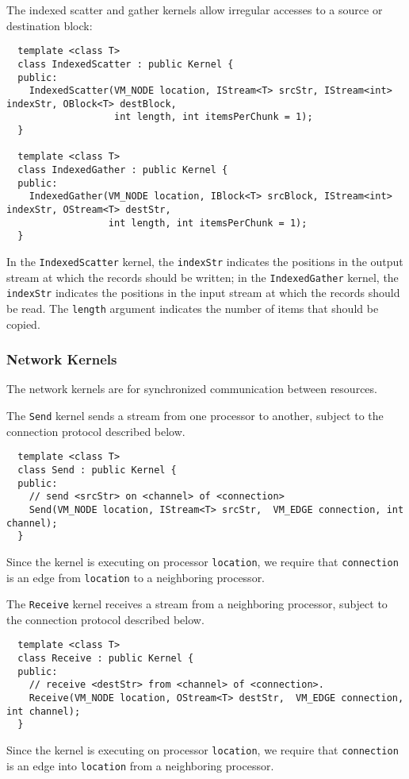 The indexed scatter and gather kernels allow irregular accesses to a
source or destination block:
{\small
\begin{verbatim}
  template <class T>
  class IndexedScatter : public Kernel {
  public:
    IndexedScatter(VM_NODE location, IStream<T> srcStr, IStream<int> indexStr, OBlock<T> destBlock, 
                   int length, int itemsPerChunk = 1);
  }

  template <class T>
  class IndexedGather : public Kernel {
  public:
    IndexedGather(VM_NODE location, IBlock<T> srcBlock, IStream<int> indexStr, OStream<T> destStr, 
                  int length, int itemsPerChunk = 1);
  }  
\end{verbatim}}
In the {\tt IndexedScatter} kernel, the {\tt indexStr} indicates the
positions in the output stream at which the records should be written;
in the {\tt IndexedGather} kernel, the {\tt indexStr} indicates the
positions in the input stream at which the records should be read.
The {\tt length} argument indicates the number of items that should be
copied.

\subsubsection*{Network Kernels}

The network kernels are for synchronized communication between
resources.

 The {\tt Send} kernel sends a stream from one processor to
another, subject to the connection protocol described below.
{\small
\begin{verbatim}
  template <class T>
  class Send : public Kernel {
  public:
    // send <srcStr> on <channel> of <connection>
    Send(VM_NODE location, IStream<T> srcStr,  VM_EDGE connection, int channel);
  }
\end{verbatim}}
Since the kernel is executing on processor {\tt location}, we require
that {\tt connection} is an edge from {\tt location} to a neighboring
processor.

 The {\tt Receive} kernel receives a stream from a
neighboring processor, subject to the connection protocol described
below.  
{\small
\begin{verbatim}
  template <class T>
  class Receive : public Kernel {
  public:
    // receive <destStr> from <channel> of <connection>.
    Receive(VM_NODE location, OStream<T> destStr,  VM_EDGE connection, int channel);
  }  
\end{verbatim}}
Since the kernel is executing on processor {\tt location}, we require
that {\tt connection} is an edge into {\tt location} from a
neighboring processor.

